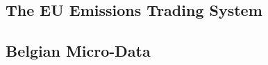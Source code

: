 %
%

\subsection{The EU Emissions Trading System}\label{sec:data:ets}


\subsection{Belgian Micro-Data}\label{sec:data:belgium}

